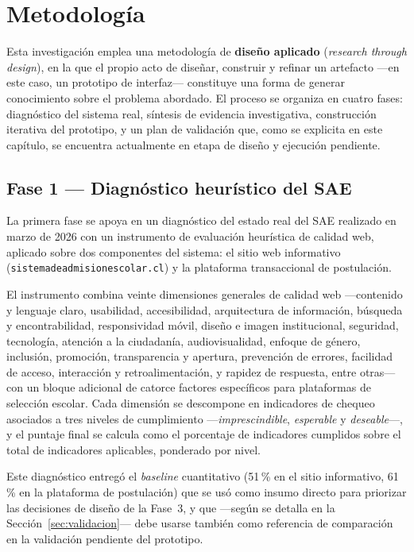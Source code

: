 \chapter{Metodología}\label{cap:metodologia}

Esta investigación emplea una metodología de \textbf{diseño aplicado} (\emph{research through design}), en la que el propio acto de diseñar, construir y refinar un artefacto —en este caso, un prototipo de interfaz— constituye una forma de generar conocimiento sobre el problema abordado. El proceso se organiza en cuatro fases: diagnóstico del sistema real, síntesis de evidencia investigativa, construcción iterativa del prototipo, y un plan de validación que, como se explicita en este capítulo, se encuentra actualmente en etapa de diseño y ejecución pendiente.

\section{Fase 1 — Diagnóstico heurístico del SAE}

La primera fase se apoya en un diagnóstico del estado real del SAE realizado en marzo de 2026 con un instrumento de evaluación heurística de calidad web, aplicado sobre dos componentes del sistema: el sitio web informativo (\texttt{sistemadeadmisionescolar.cl}) y la plataforma transaccional de postulación.

El instrumento combina veinte dimensiones generales de calidad web —contenido y lenguaje claro, usabilidad, accesibilidad, arquitectura de información, búsqueda y encontrabilidad, responsividad móvil, diseño e imagen institucional, seguridad, tecnología, atención a la ciudadanía, audiovisualidad, enfoque de género, inclusión, promoción, transparencia y apertura, prevención de errores, facilidad de acceso, interacción y retroalimentación, y rapidez de respuesta, entre otras— con un bloque adicional de catorce factores específicos para plataformas de selección escolar. Cada dimensión se descompone en indicadores de chequeo asociados a tres niveles de cumplimiento —\emph{imprescindible}, \emph{esperable} y \emph{deseable}—, y el puntaje final se calcula como el porcentaje de indicadores cumplidos sobre el total de indicadores aplicables, ponderado por nivel.

Este diagnóstico entregó el \emph{baseline} cuantitativo (51\,\% en el sitio informativo, 61\,\% en la plataforma de postulación) que se usó como insumo directo para priorizar las decisiones de diseño de la Fase~3, y que —según se detalla en la Sección~\ref{sec:validacion}— debe usarse también como referencia de comparación en la validación pendiente del prototipo.

